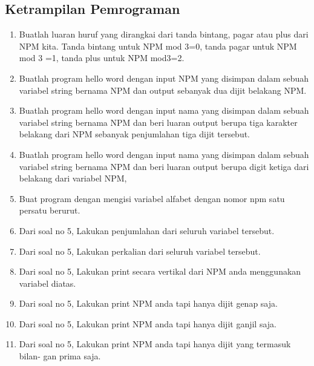 \subsection{Ketrampilan Pemrograman}
\begin{enumerate}
    \item Buatlah luaran huruf yang dirangkai dari tanda bintang, pagar atau plus dari
    NPM kita. Tanda bintang untuk NPM mod 3=0, tanda pagar untuk NPM mod
    3 =1, tanda plus untuk NPM mod3=2.
    

    \item Buatlah program hello word dengan input NPM yang disimpan dalam sebuah
    variabel string bernama NPM dan output sebanyak dua dijit belakang NPM.
    
    
    \item Buatlah program hello word dengan input nama yang disimpan dalam sebuah
    variabel string bernama NPM dan beri luaran output berupa tiga karakter
    belakang dari NPM sebanyak penjumlahan tiga dijit tersebut.
    

    \item Buatlah program hello word dengan input nama yang disimpan dalam sebuah
    variabel string bernama NPM dan beri luaran output berupa digit ketiga dari
    belakang dari variabel NPM,
    

    \item Buat program dengan mengisi variabel alfabet
    dengan nomor npm satu persatu berurut.
    

    \item Dari soal no 5, Lakukan penjumlahan dari seluruh variabel tersebut.
    

    \item Dari soal no 5, Lakukan perkalian dari seluruh variabel tersebut.
    

    \item Dari soal no 5, Lakukan print secara vertikal dari NPM anda menggunakan
    variabel diatas.
    

    \item Dari soal no 5, Lakukan print NPM anda tapi hanya dijit genap saja.
    

    \item Dari soal no 5, Lakukan print NPM anda tapi hanya dijit ganjil saja.
    

    \item Dari soal no 5, Lakukan print NPM anda tapi hanya dijit yang termasuk bilan-
    gan prima saja.
    

\end{enumerate}
